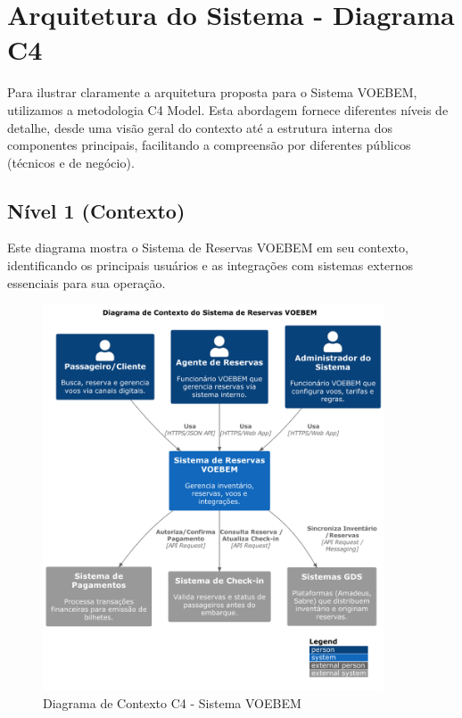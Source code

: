 \chapter{Arquitetura do Sistema - Diagrama C4}
\label{chap:arquitetura-c4}

Para ilustrar claramente a arquitetura proposta para o Sistema VOEBEM, utilizamos a metodologia C4 Model. Esta abordagem fornece diferentes níveis de detalhe, desde uma visão geral do contexto até a estrutura interna dos componentes principais, facilitando a compreensão por diferentes públicos (técnicos e de negócio).

\section{Nível 1 (Contexto)}
\label{sec:c4-contexto}

Este diagrama mostra o Sistema de Reservas VOEBEM em seu contexto, identificando os principais usuários e as integrações com sistemas externos essenciais para sua operação.

\begin{figure}[htbp]
    \centering
    \includegraphics[width=0.9\textwidth]{../assets/c4-n1-contexto.pdf}
    \caption{Diagrama de Contexto C4 - Sistema VOEBEM}
    \label{fig:c4-contexto}
\end{figure}

